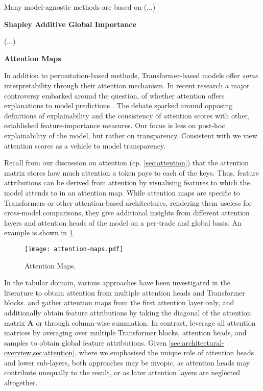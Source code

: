 Many model-agnostic methods are based on (...)

\textbf{Shapley Additive Global Importance}

(...)

\textbf{Attention Maps}

In addition to permutation-based methods, Transformer-based models offer \emph{some} interpretability through their attention mechanism. In recent research a major controversy embarked around the question, of whether attention offers explanations to model predictions \autocites[cp.][150]{bastingsElephantInterpretabilityRoom2020}[][5--7]{jainAttentionNotExplanation2019}[][9]{wiegreffeAttentionNotNot2019}. The debate sparked around opposing definitions of explainability and the consistency of attention scores with other, established feature-importance measures. Our focus is less on post-hoc explainability of the model, but rather on transparency. Consistent with \textcite[][8]{wiegreffeAttentionNotNot2019} we view attention scores as a vehicle to model transparency.

Recall from our discussion on attention (cp. \cref{sec:attention}) that the attention matrix stores how much attention a token pays to each of the keys. Thus, feature attributions can be derived from attention by visualising features to which the model attends to in an attention map. While attention maps are specific to Transformers or other attention-based architectures, rendering them useless for cross-model comparisons, they give additional insights from different attention layers and attention heads of the model on a per-trade and global basis. An example is shown in \cref{fig:attention-maps}.

\begin{figure}[ht]
    \centering
    \texttt{[image: attention-maps.pdf]}
    \caption[Attention Maps]{Attention Maps.}
    \label{fig:attention-maps}
\end{figure}

In the tabular domain, various approaches have been investigated in the literature to obtain attention from multiple attention heads and Transformer blocks. \textcite[][18]{somepalliSaintImprovedNeural2021} and \textcite[][11]{borisovDeepNeuralNetworks2022} gather attention maps from the first attention layer only, and \textcite[][11]{borisovDeepNeuralNetworks2022} additionally obtain feature attributions by taking the diagonal of the attention matrix $\mathbf{A}$ or through column-wise summation. In contrast, \textcite[][10]{gorishniyRevisitingDeepLearning2021} leverage all attention matrices by averaging over multiple Transformer blocks, attention heads, and samples to obtain global feature attributions. Given \cref{sec:architectural-overview,sec:attention}, where we emphasised the unique role of attention heads and lower sub-layers, both approaches may be myopic, as attention heads may contribute unequally to the result, or as later attention layers are neglected altogether.


